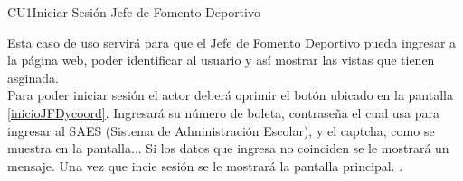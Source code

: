 \begin{UseCase}{CU1}{Iniciar Sesión Jefe de Fomento Deportivo}{
		\noindent Esta caso de uso servirá para que el Jefe de Fomento Deportivo pueda ingresar a la página web, poder identificar al usuario y así mostrar las vistas que tienen asginada. \\
    	Para poder iniciar sesión el actor deberá oprimir el botón  ubicado en la pantalla \ref{inicioJFDycoord}. Ingresará su número de boleta, contraseña el cual usa para ingresar al SAES (Sistema de Administración Escolar), y el captcha, como se muestra en la pantalla... Si los datos que ingresa no coinciden se le mostrará un mensaje.
        Una vez que incie sesión se le mostrará la pantalla principal.
        .
        
	} \label{CU1_Iniciarsesion}
		\end{UseCase}
	\pagebreak
	
